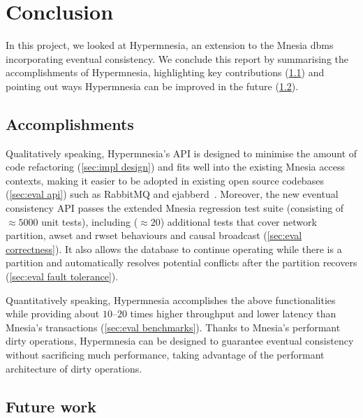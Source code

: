 \section{Conclusion} \label{sec:concl}


In this project, we looked at Hypermnesia, an extension to the Mnesia \acrshort{dbms}
incorporating eventual consistency. We conclude
this report by summarising the accomplishments of Hypermnesia, highlighting
key contributions (\cref{sec:concl accomplishments}) and
pointing out ways Hypermnesia can be improved in the future (\cref{sec:concl future}).


\subsection{Accomplishments} \label{sec:concl accomplishments}

Qualitatively speaking, Hypermnesia's API is designed to minimise the amount of 
code refactoring (\cref{sec:impl design}) and fits well into the existing Mnesia 
access contexts, making it easier to be adopted in existing open source codebases
(\cref{sec:eval api}) such as RabbitMQ and 
ejabberd~\cite{vmware2023rabbitmq,processone2023ejabberd}.
Moreover, the new eventual consistency API passes the extended Mnesia regression 
test suite (consisting of \(\approx 5000\) unit tests), including (\(\approx 20\)) 
additional tests that cover network partition, \acrshort{awset} and \acrshort{rwset} 
behaviours and causal broadcast (\cref{sec:eval correctness}). It also allows the database to 
continue operating while there is a partition and automatically resolves potential 
conflicts after the partition recovers (\cref{sec:eval fault tolerance}).

Quantitatively speaking, Hypermnesia accomplishes the above functionalities
while providing about \(10\)--\(20\) times higher throughput and 
lower latency than Mnesia's transactions (\cref{sec:eval benchmarks}). Thanks to Mnesia's
performant dirty operations, Hypermnesia can be designed to guarantee eventual 
consistency without sacrificing much performance, taking advantage of the
performant architecture of dirty operations.


\subsection{Future work} \label{sec:concl future}

